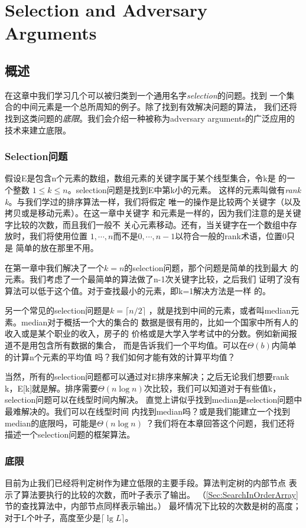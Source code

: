 \chapter{Selection and Adversary Arguments}\label{Sec:Chapter:SelectionandAdversaryArguments}
\section{概述}
在这章中我们学习几个可以被归类到一个通用名字\emph{selection}的问题。找到
一个集合的中间元素是一个总所周知的例子。除了找到有效解决问题的算法，
我们还将找到这类问题的\emph{底限}。我们会介绍一种被称为adversary
arguments的广泛应用的技术来建立底限。

\subsection{Selection问题}
假设E是包含n个元素的数组，数组元素的关键字属于某个线型集合，令k是
的一个整数 $1\leq k \leq n$。selection问题是找到E中第k小的元素。
这样的元素叫做有\emph{rank k}。与我们学过的排序算法一样，我们将假定
唯一的操作是比较两个关键字（以及拷贝或是移动元素）。在这一章中关键字
和元素是一样的，因为我们注意的是关键字比较的次数，而且我们一般不
关心元素移动。还有，当关键字在一个数组中存放时，我们将使用位置
$1, \cdots, n$而不是$0, \cdots, n-1$以符合一般的rank术语，位置0只是
简单的放在那里不用。

在第一章中我们解决了一个$k=n$的selection问题，那个问题是简单的找到最大
的元素。我们考虑了一个最简单的算法做了n-1次关键字比较，之后我们
证明了没有算法可以低于这个值。对于查找最小的元素，即k=1解决方法是一样
的。

另一个常见的selection问题是$k=\lceil n/2 \rceil$
，就是找到中间的元素，或者叫median元素。median对于概括一个大的集合的
数据是很有用的，比如一个国家中所有人的收入或是某个职业的收入，房子的
价格或是大学入学考试中的分数。例如新闻报道不是用包含所有数据的集合，
而是告诉我们一个平均值。可以在$\Theta(b)$内简单的计算n个元素的平均值
吗？我们如何才能有效的计算平均值？

当然，所有的selection问题都可以通过对E排序来解决；之后无论我们想要rank
k，E[k]就是解。排序需要$\Theta(n\log
n)$次比较，我们可以知道对于有些值k，selection问题可以在线型时间内解决。
直觉上讲似乎找到median是selection问题中最难解决的。我们可以在线型时间
内找到median吗？或是我们能建立一个找到median的底限吗，可能是$\Theta(n
\log n)$
？我们将在本章回答这个问题，我们还将描述一个selection问题的框架算法。
\subsection{底限}
目前为止我们已经将判定树作为建立低限的主要手段。算法判定树的内部节点
表示了算法要执行的比较的次数，而叶子表示了输出。
（\ref{Sec:SearchInOrderArray}节的查找算法中，内部节点同样表示输出。）
最坏情况下比较的次数是树的高度；对于L个叶子，高度至少是$\lceil \lg L
\rceil$。

